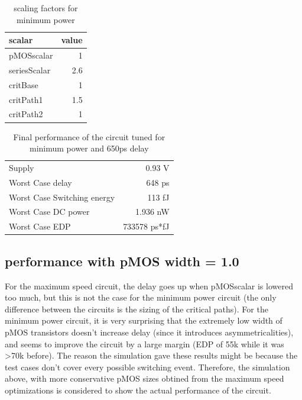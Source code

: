 \documentclass[english]{article}
\begin{document}
\begin{table}[h]
\centering
\begin{tabular}{ |l|r| }
\hline
scalar	& value \\
\hline
 pMOSscalar		& 1 \\
 seriesScalar   & 2.6 \\
 critBase   	& 1 \\
 critPath1   	& 1.5 \\
 critPath2    	& 1 \\
\hline
\end{tabular}
\caption{scaling factors for minimum power}
\label{MinPowerScalars}
\end{table}

\begin{table}[h]
\centering
\begin{tabular}{ |l|r| }
\hline
Supply	&	0.93 V \\
Worst Case delay &            648 ps \\
Worst Case Switching energy & 113 fJ\\
Worst Case DC power &        1.936 nW \\
Worst Case EDP &              733578 ps*fJ \\
\hline
\end{tabular}
\caption{Final performance of the circuit tuned for minimum power and 650ps delay}
\label{PowerPerformance}
\end{table}   


\subsection{performance with pMOS width = 1.0}

For the maximum speed circuit, the delay goes up when pMOSscalar is lowered too much, but this is not the case for the minimum power circuit (the only difference between the circuits is the sizing of the critical paths).
For the minimum power circuit, it is very surprising that the extremely low width of pMOS transistors doesn't increase delay (since it introduces asymmetricalities), and seems to improve the circuit by a large margin (EDP of 55k while it was \textgreater 70k before). The reason the simulation gave these results might be because the test cases don't cover every possible switching event. 
Therefore, the simulation above, with more conservative pMOS sizes obtined from the maximum speed optimizations is considered to show the actual performance of the circuit.
\end{document}
